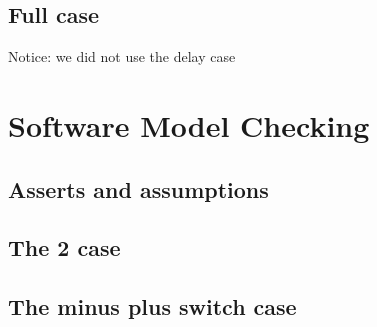 \documentclass[a4paper]{article}
\begin{document}
	
	\subsection{Full case}
	Notice: we did not use the delay case
	
	
	\section{Software Model Checking}
	
	
	\subsection{Asserts and assumptions}
	
	
	\subsection{The 2 case}
	
	
	\subsection{The minus plus switch case}
	
	
	
\end{document}
